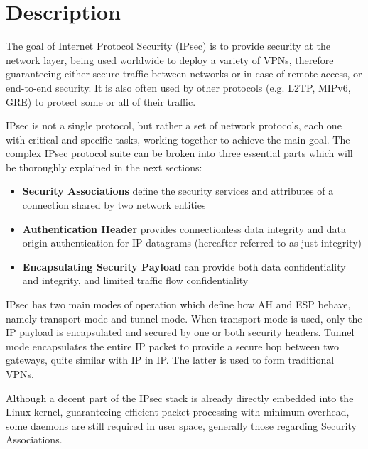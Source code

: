 \documentclass[a4paper,12pt]{report}
\begin{document}
	\section{Description }
		The goal of Internet Protocol Security (IPsec) is to provide security at the network layer, being used worldwide to deploy a variety of VPNs, therefore guaranteeing either secure traffic between networks or in case of remote access, or end-to-end security. It is also often used by other protocols (e.g. L2TP, MIPv6, GRE) to protect some or all of their traffic.
		
		IPsec is not a single protocol, but rather a set of network protocols, each one with critical and specific tasks, working together to achieve the main goal. The complex IPsec protocol suite can be broken into three essential parts which will be thoroughly explained in the next sections:
		\begin{itemize}
			\item \textbf{Security Associations} define the security services and attributes of a connection shared by two network entities
			\item \textbf{Authentication Header} provides connectionless data integrity and data origin authentication for IP datagrams (hereafter referred to as just integrity) \cite{rfc4302}
			\item \textbf{Encapsulating Security Payload} can provide both data confidentiality and integrity, and limited traffic flow confidentiality \cite{rfc2406}
		\end{itemize}
		
		IPsec has two main modes of operation which define how AH and ESP behave, namely transport mode and tunnel mode. When transport mode is used, only the IP payload is encapsulated and secured by one or both security headers. Tunnel mode encapsulates the entire IP packet to provide a secure hop between two gateways, quite similar with IP in IP. The latter is used to form traditional VPNs.
		
		Although a decent part of the IPsec stack is already directly embedded into the Linux kernel, guaranteeing efficient packet processing with minimum overhead, some daemons are still required in user space, generally those regarding Security Associations.
		
\end{document}
